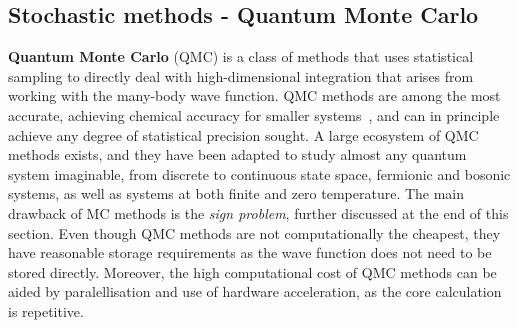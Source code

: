 \subsection{Stochastic methods - Quantum Monte Carlo}
\label{subsec:qmc-overview}
\textbf{Quantum Monte Carlo} (QMC) is a class of methods that uses statistical sampling to directly deal with high-dimensional integration that arises from working with the many-body wave function. QMC methods are among the most accurate, achieving chemical accuracy for smaller systems~\cite{foulkes2001quantum}, and can in principle achieve any degree of statistical precision sought. A large ecosystem of QMC methods exists, and they have been adapted to study almost any quantum system imaginable, from discrete to continuous state space, fermionic and bosonic systems, as well as systems at both finite and zero temperature. The main drawback of MC methods is the \emph{sign problem}, further discussed at the end of this section. Even though QMC methods are not computationally the cheapest, they have reasonable storage requirements as the wave function does not need to be stored directly. Moreover, the high computational cost of QMC methods can be aided by paralellisation and use of hardware acceleration, as the core calculation is repetitive.

